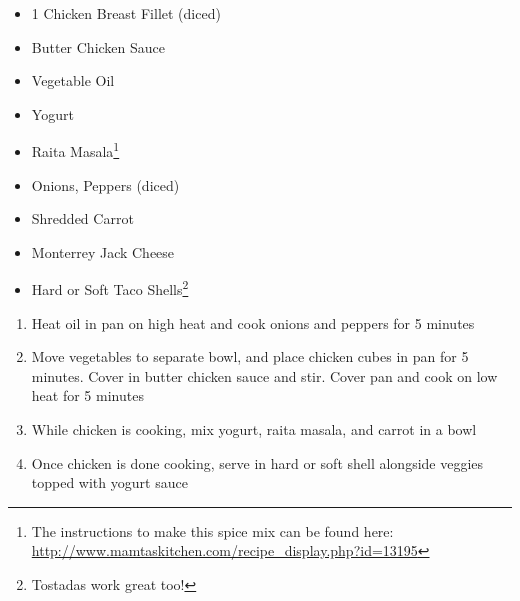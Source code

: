 \documentclass[oneside]{recipe}
\newcommand{\recipecolumn}[2]{
	\begin{multicols}{2}
	\raggedcolumns
	#1
	\columnbreak
	#2
	\end{multicols}
}
\begin{document}
\recipecolumn{
	\begin{itemize}
		\item 1 Chicken Breast Fillet (diced)
		\item Butter Chicken Sauce
		\item Vegetable Oil
		\item Yogurt
		\item Raita Masala\footnote{The instructions to make this spice mix can be found here: \url{http://www.mamtaskitchen.com/recipe_display.php?id=13195}}
		\item Onions, Peppers (diced)
		\item Shredded Carrot
		\item Monterrey Jack Cheese
		\item Hard or Soft Taco Shells\footnote{Tostadas work great too!}
	\end{itemize}
}{
	\begin{enumerate}
		\item Heat oil in pan on high heat and cook onions and peppers for 5 minutes
		\item Move vegetables to separate bowl, and place chicken cubes in pan for 5 minutes. Cover in butter chicken sauce and stir. Cover pan and cook on low heat for 5 minutes
		\item While chicken is cooking, mix yogurt, raita masala, and carrot in a bowl
		\item Once chicken is done cooking, serve in hard or soft shell alongside veggies topped with yogurt sauce
	\end{enumerate}
}
\end{document}
